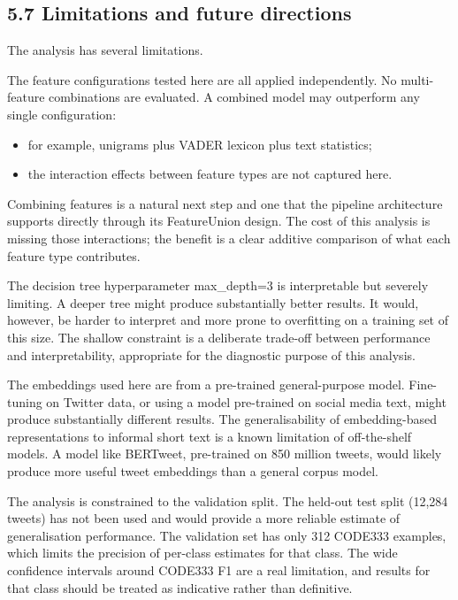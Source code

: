 \documentclass[12pt]{article}
\begin{document}
\subsection*{5.7 Limitations and future directions}



The analysis has several limitations.



The feature configurations tested here are all applied independently. No multi-feature combinations are evaluated. A combined model may outperform any single configuration:

\begin{itemize}

  \item for example, unigrams plus VADER lexicon plus text statistics;

  \item the interaction effects between feature types are not captured here.

\end{itemize} Combining features is a natural next step and one that the pipeline architecture supports directly through its FeatureUnion design. The cost of this analysis is missing those interactions; the benefit is a clear additive comparison of what each feature type contributes.



The decision tree hyperparameter max\_depth=3 is interpretable but severely limiting. A deeper tree might produce substantially better results. It would, however, be harder to interpret and more prone to overfitting on a training set of this size. The shallow constraint is a deliberate trade-off between performance and interpretability, appropriate for the diagnostic purpose of this analysis.



The embeddings used here are from a pre-trained general-purpose model. Fine-tuning on Twitter data, or using a model pre-trained on social media text, might produce substantially different results. The generalisability of embedding-based representations to informal short text is a known limitation of off-the-shelf models. A model like BERTweet, pre-trained on 850 million tweets, would likely produce more useful tweet embeddings than a general corpus model.



The analysis is constrained to the validation split. The held-out test split (12,284 tweets) has not been used and would provide a more reliable estimate of generalisation performance. The validation set has only 312 CODE333 examples, which limits the precision of per-class estimates for that class. The wide confidence intervals around CODE333 F1 are a real limitation, and results for that class should be treated as indicative rather than definitive.
\end{document}
